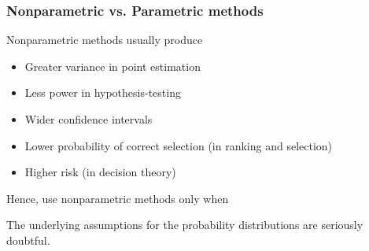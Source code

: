 \begin{frame}[fragile]
	\frametitle{Nonparametric vs. Parametric methods}
	Nonparametric methods usually produce\\[1em]
	\begin{itemize}
		\item Greater variance in point estimation
		\item Less power in hypothesis-testing
		\item Wider confidence intervals
		\item Lower probability of correct selection (in ranking and selection)
		\item Higher risk (in decision theory)
	\end{itemize}
	\vfill

Hence, use nonparametric methods only when
\vfill

\begin{center}
\begin{minipage}{0.62\textwidth}
	\centering
	The underlying assumptions for the probability distributions are seriously doubtful.
\end{minipage}
\end{center}
\end{frame}

